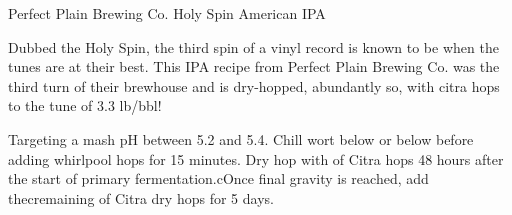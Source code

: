 \begin{recipie}{Perfect Plain Brewing Co. Holy Spin American IPA}

\begin{aboutblock}
Dubbed the Holy Spin, the third spin of a vinyl record is known to be when the tunes
are at their best. This IPA recipe from Perfect Plain Brewing Co. was the third turn
of their brewhouse and is dry-hopped, abundantly so, with citra hops to the tune
of 3.3 lb/bbl!
\end{aboutblock}


\begin{methodandtiming}
 
\begin{mashsteps}
\end{mashsteps}

\begin{directions}
Targeting a mash pH between 5.2 and 5.4. Chill wort below  or below
before adding whirlpool hops for 15 minutes. Dry hop with  of Citra
hops 48 hours after the start of primary fermentation.cOnce final gravity is
reached, add thecremaining  of Citra dry hops for 5 days.
\end{directions}

\end{methodandtiming}

\pagebreak

\begin{ingredientsblock}

\begin{malts}
\end{malts}

\begin{hops}
\end{hops}

\begin{yeasts}
\end{yeasts}

\end{ingredientsblock}

\end{recipie}

